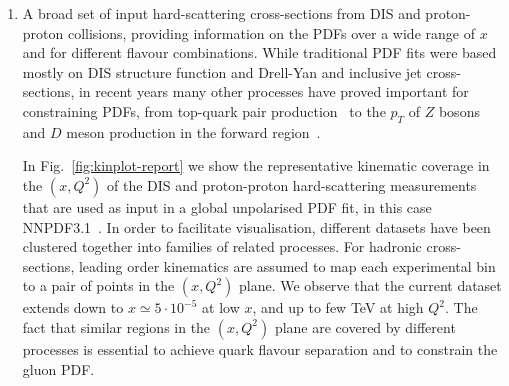 \begin{enumerate}
\item A broad set of input hard-scattering cross-sections from DIS and proton-proton collisions, providing information on the PDFs
  over a wide range of $x$ and for different flavour combinations.
  While traditional PDF fits were based mostly on DIS structure function and Drell-Yan
  and inclusive jet
  cross-sections, in recent years many other processes have proved important for constraining PDFs, from top-quark pair production~\cite{Czakon:2016olj}
  to the $p_T$ of $Z$ bosons~\cite{Boughezal:2017nla}
  and $D$ meson production in the forward region~\cite{Gauld:2016kpd}. %

  In Fig.~\ref{fig:kinplot-report} we show the representative kinematic coverage in the
    $(x,Q^2)$ of the DIS and proton-proton hard-scattering measurements that are
    used as input in a global unpolarised PDF fit, in this case NNPDF3.1~\cite{Ball:2017nwa}.
    In order to facilitate visualisation, different
    datasets have been clustered together into families of
    related processes.
      For hadronic cross-sections, leading order kinematics are assumed to map
    each experimental bin to a pair of points in the $(x,Q^2)$ plane.
    We observe that the current dataset extends down to $x\simeq 5\cdot 10^{-5}$
    at low $x$, and up to few TeV at high $Q^2$.
    The fact that similar regions in the $(x,Q^2)$ plane are covered by
    different processes is essential to achieve quark
    flavour separation and to constrain the gluon PDF.


\end{enumerate}
